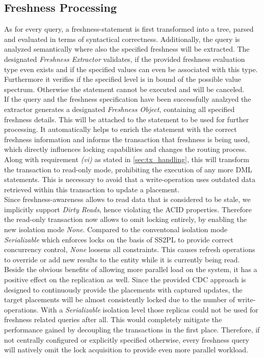 
\subsection{Freshness Processing}
\label{sec:fresh_proc}

As for every query, a freshness-statement is first transformed into a tree, parsed and evaluated in terms of syntactical correctness. 
Additionally, the query is analyzed semantically where also the specified freshness will be extracted. The designated \textit{Freshness Extractor} 
validates, if the provided freshness evaluation type even exists and if the specified values can even be associated with this type.
Furthermore it verifies if the specified level is in bound of the possible value spectrum. 
Otherwise the statement cannot be executed and will be canceled.\\
If the query and the freshness specification have been successfully analzyed the extractor generates a designated \textit{Freshness Object}, 
containing all specified freshness details. This will be attached to the statement to be used for further processing.
It automatically helps to enrich the statement with the correct freshness information and informs the transaction that freshness is being used,
which directly influences locking capabilities and changes the routing process. 
Along with requirement \textit{(vi)} as stated in \ref{sec:tx_handling}, this will transform the transaction to read-only mode, prohibiting the execution of any more DML
statements. This is necessary to avoid that a write-operation uses outdated data retrieved within this transaction to update a placement.\\

Since freshness-awareness allows to read data that is considered to be stale, we implicitly support \emph{Dirty Reads}, hence violating the ACID properties.
Therefore the read-only transaction now allows to omit locking entirely, by enabling the new isolation mode \emph{None}. 
Compared to the conventonal isolation mode \emph{Serializable} which enforces locks on the basis of SS2PL to provide correct concurrency control, \emph{None} 
loosens all constraints. This causes refresh operations to override or add new results to the entity while it is currently being read. 
Beside the obvious benefits of allowing more parallel load on the system, it has a positive effect on the replication as well.
Since the provided CDC approach is designed to continuously provide the placements with captured updates, the target placements will be almost consistently locked due 
to the number of write-operations.
With a \emph{Serializable} isolation level those replicas could not be used for freshness related queries after all. 
This would completely mitigate the performance gained by decoupling the transactions in the first place. 
Therefore, if not centrally configured or explicitly specified otherwise, every freshness query will natively omit the lock acquisition to provide even more parallel workload.\\


